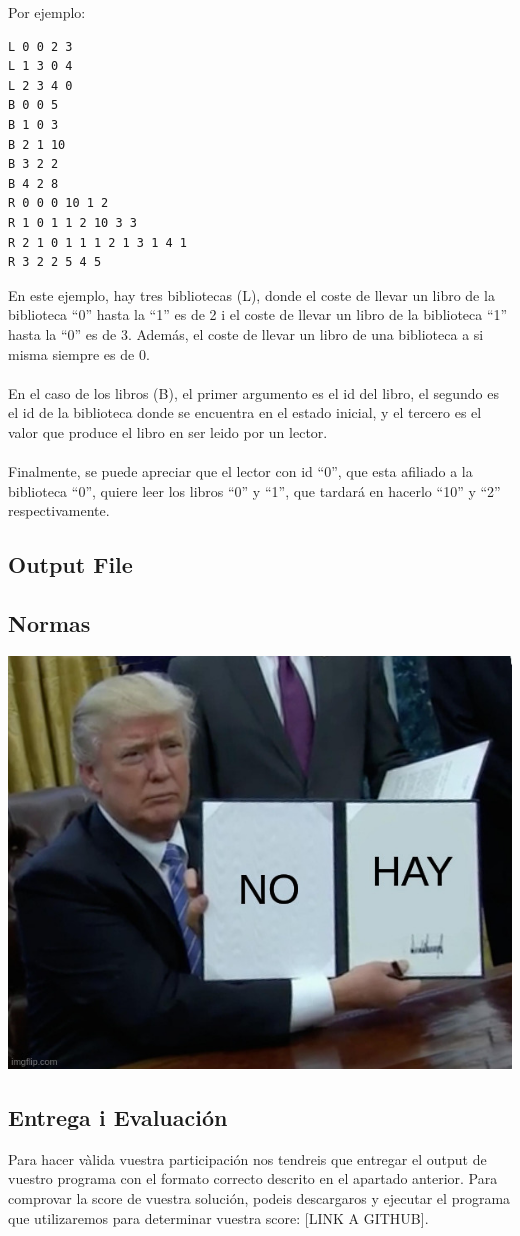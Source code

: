 \documentclass{article}
\begin{document}
Por ejemplo:
\begin{verbatim}
L 0 0 2 3
L 1 3 0 4
L 2 3 4 0
B 0 0 5
B 1 0 3
B 2 1 10
B 3 2 2
B 4 2 8
R 0 0 0 10 1 2
R 1 0 1 1 2 10 3 3
R 2 1 0 1 1 1 2 1 3 1 4 1
R 3 2 2 5 4 5
\end{verbatim}
%
En este ejemplo, hay tres bibliotecas (L), donde el coste de llevar un libro
de la biblioteca ``0'' hasta la ``1'' es de 2 i el coste de llevar
un libro de la biblioteca ``1'' hasta la ``0'' es de 3. Además, el coste de
llevar un libro de una biblioteca a si misma siempre es de 0.\\\\
%
En el caso de los libros (B),  el primer argumento es el id del libro, 
el segundo es el id de la biblioteca donde se encuentra
en el estado inicial, y el tercero es el valor que produce el libro en
ser leido por un lector.\\\\
%
Finalmente, se puede apreciar que el lector con id ``0'', que esta afiliado
a la biblioteca ``0'', quiere leer los libros ``0'' y ``1'', que tardará en
hacerlo ``10'' y ``2'' respectivamente.

\subsection{Output File}


\subsection{Normas}
\includegraphics[width=\linewidth]{meme.jpg}

\subsection{Entrega i Evaluación}
Para hacer vàlida vuestra participación nos tendreis que entregar el output de vuestro programa con el formato correcto descrito en el apartado anterior. Para comprovar la score de vuestra solución, podeis descargaros y ejecutar el programa que utilizaremos para determinar vuestra score: [LINK A GITHUB]. 
\end{document}
